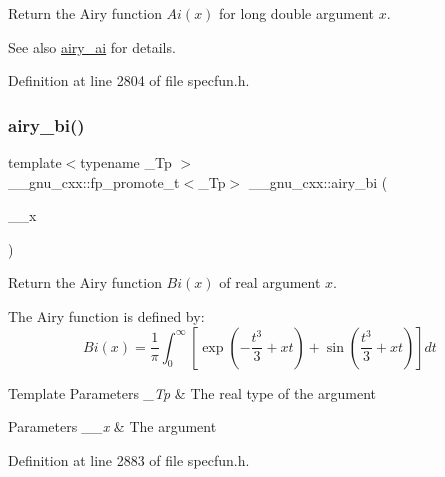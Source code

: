 Return the Airy function $ Ai(x) $ for {\ttfamily long double} argument $ x $.

\begin{DoxySeeAlso}{See also}
\hyperlink{group__gnu__math__spec__func_gac84f8c4ad00ee677ad4d0b785925d983}{airy\+\_\+ai} for details. 
\end{DoxySeeAlso}


Definition at line 2804 of file specfun.\+h.

\mbox{\label{group__gnu__math__spec__func_ga33c172cab7f8e9c99537444c7e30801a}} 
\subsubsection{\texorpdfstring{airy\+\_\+bi()}{airy\_bi()}\hspace{0.1cm}{\footnotesize\ttfamily [1/2]}}
{\footnotesize\ttfamily template$<$typename \+\_\+\+Tp $>$ \\
\+\_\+\+\_\+gnu\+\_\+cxx\+::fp\+\_\+promote\+\_\+t$<$\+\_\+\+Tp$>$ \+\_\+\+\_\+gnu\+\_\+cxx\+::airy\+\_\+bi (\begin{DoxyParamCaption}\item[{\+\_\+\+Tp}]{\+\_\+\+\_\+x }\end{DoxyParamCaption})\hspace{0.3cm}{\ttfamily [inline]}}

Return the Airy function $ Bi(x) $ of real argument $ x $.

The Airy function is defined by\+: \[ Bi(x) = \frac{1}{\pi}\int_0^\infty \left[ \exp \left(-\frac{t^3}{3} + xt \right) + \sin \left(\frac{t^3}{3} + xt \right) \right] dt \]


\begin{DoxyTemplParams}{Template Parameters}
{\em \+\_\+\+Tp} & The real type of the argument \\
\hline
\end{DoxyTemplParams}

\begin{DoxyParams}{Parameters}
{\em \+\_\+\+\_\+x} & The argument \\
\hline
\end{DoxyParams}


Definition at line 2883 of file specfun.\+h.

